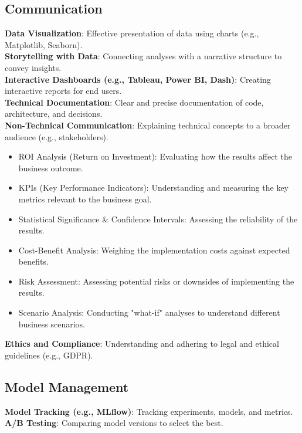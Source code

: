 \documentclass[english, threecolumn]{latex4ei/latex4ei_sheet}
\begin{document}
\begin{sectionbox}
\subsection{Communication}
    \textbf{Data Visualization}: Effective presentation of data using charts (e.g., Matplotlib, Seaborn).\\
    \textbf{Storytelling with Data}: Connecting analyses with a narrative structure to convey insights.\\
    \textbf{Interactive Dashboards (e.g., Tableau, Power BI, Dash)}: Creating interactive reports for end users.\\
    \textbf{Technical Documentation}: Clear and precise documentation of code, architecture, and decisions.\\
    \textbf{Non-Technical Communication}: Explaining technical concepts to a broader audience (e.g., stakeholders).\\
        \begin{itemize}
            \item ROI Analysis (Return on Investment): Evaluating how the results affect the business outcome.
            \item KPIs (Key Performance Indicators): Understanding and measuring the key metrics relevant to the business goal.
            \item Statistical Significance \& Confidence Intervals: Assessing the reliability of the results.
            \item Cost-Benefit Analysis: Weighing the implementation costs against expected benefits.
            \item Risk Assessment: Assessing potential risks or downsides of implementing the results.
            \item Scenario Analysis: Conducting "what-if" analyses to understand different business scenarios.
        \end{itemize}
    \textbf{Ethics and Compliance}: Understanding and adhering to legal and ethical guidelines (e.g., GDPR).
    
\subsection{Model Management}
    \textbf{Model Tracking (e.g., MLflow)}: Tracking experiments, models, and metrics.\\
    \textbf{A/B Testing}: Comparing model versions to select the best.\\
\end{sectionbox}
\end{document}
